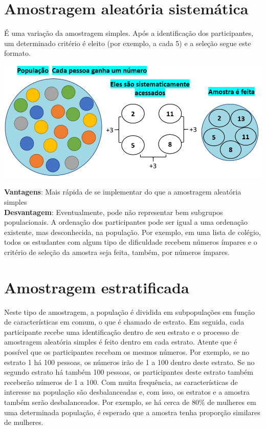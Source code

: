 \documentclass[
]{book}
\begin{document}
\hypertarget{amostragem-aleatuxf3ria-sistemuxe1tica}{%
\section{Amostragem aleatória sistemática}\label{amostragem-aleatuxf3ria-sistemuxe1tica}}

É uma variação da amostragem simples. Após a identificação dos participantes, um determinado critério é eleito (por exemplo, a cada 5) e a seleção segue este formato.

\includegraphics{./img/cap_a_sistematica.png}

\textbf{Vantagens}: Mais rápida de se implementar do que a amostragem aleatória simples\\
\textbf{Desvantagem}: Eventualmente, pode não representar bem subgrupos populacionais. A ordenação dos participantes pode ser igual a uma ordenação existente, mas desconhecida, na população. Por exemplo, em uma lista de colégio, todos os estudantes com algum tipo de dificuldade recebem números ímpares e o critério de seleção da amostra seja feita, também, por números ímpares.

\hypertarget{amostragem-estratificada}{%
\section{Amostragem estratificada}\label{amostragem-estratificada}}

Neste tipo de amostragem, a população é dividida em subpopulações em função de características em comum, o que é chamado de estrato. Em seguida, cada participante recebe uma identificação dentro de seu estrato e o processo de amostragem aleatória simples é feito dentro em cada estrato. Atente que é possível que os participantes recebam os mesmos números. Por exemplo, se no estrato 1 há 100 pessoas, os números irão de 1 a 100 dentro deste estrato. Se no segundo estrato há também 100 pessoas, os participantes deste estrato também receberão números de 1 a 100. Com muita frequência, as características de interesse na população são desbalanceadas e, com isso, os estratos e a amostra também serão desbalanceados. Por exemplo, se há cerca de 80\% de mulheres em uma determinada população, é esperado que a amostra tenha proporção similares de mulheres.
\end{document}
